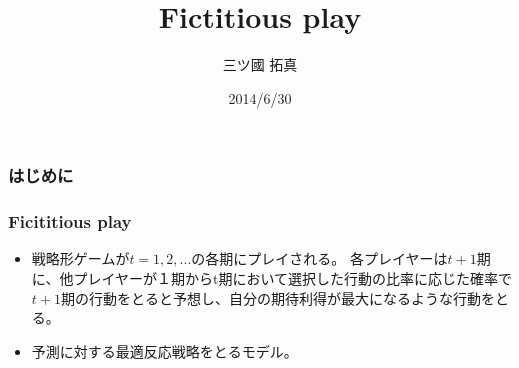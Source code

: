 \documentclass[dvipdfmx,fleqn]{beamer}
\title{\Large Fictitious play}
\author{\large 三ツ國  拓真}
\date{\small 2014/6/30}
\begin{document}
\sffamily
\gtfamily


\begin{frame}
  \titlepage
  \thispagestyle{empty}
\end{frame}

\setcounter{framenumber}{0}




\begin{frame}
\frametitle{はじめに}
\end{frame}



\begin{frame}
\frametitle{Ficititious play}
\begin{itemize}\setlength{\parskip}{0.5em}
\item
戦略形ゲームが$t=1,2,...$の各期にプレイされる。
各プレイヤーは$t+1$期に、他プレイヤーが１期からt期において選択した行動の比率に応じた確率で$t+1$期の行動をとると予想し、自分の期待利得が最大になるような行動をとる。\pause


\item
予測に対する最適反応戦略をとるモデル。
 \pause

\end{itemize}
\end{frame}
\end{document}
